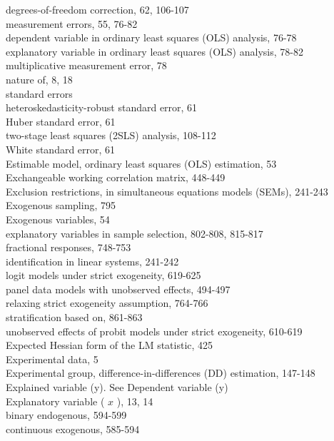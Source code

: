 \documentclass[10pt]{article}
\begin{document}
degrees-of-freedom correction, 62, 106-107\\
measurement errors, 55, 76-82\\
dependent variable in ordinary least squares (OLS) analysis, 76-78\\
explanatory variable in ordinary least squares (OLS) analysis, 78-82\\
multiplicative measurement error, 78\\
nature of, 8, 18\\
standard errors\\
heteroskedasticity-robust standard error, 61\\
Huber standard error, 61\\
two-stage least squares (2SLS) analysis, 108-112\\
White standard error, 61\\
Estimable model, ordinary least squares (OLS) estimation, 53\\
Exchangeable working correlation matrix, 448-449\\
Exclusion restrictions, in simultaneous equations models (SEMs), 241-243\\
Exogenous sampling, 795\\
Exogenous variables, 54\\
explanatory variables in sample selection, 802-808, 815-817\\
fractional responses, 748-753\\
identification in linear systems, 241-242\\
logit models under strict exogeneity, 619-625\\
panel data models with unobserved effects, 494-497\\
relaxing strict exogeneity assumption, 764-766\\
stratification based on, 861-863\\
unobserved effects of probit models under strict exogeneity, 610-619\\
Expected Hessian form of the LM statistic, 425\\
Experimental data, 5\\
Experimental group, difference-in-differences (DD) estimation, 147-148\\
Explained variable (y). See Dependent variable (y)\\
Explanatory variable ( $x$ ), 13, 14\\
binary endogenous, 594-599\\
continuous exogenous, 585-594\\
\end{document}
